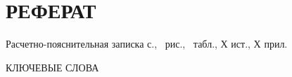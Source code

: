 \section*{РЕФЕРАТ}

Расчетно-пояснительная записка \pageref{LastPage} с., \totalfigures\ рис., \totaltables\ табл., Х ист., Х прил.

КЛЮЧЕВЫЕ СЛОВА

\pagebreak